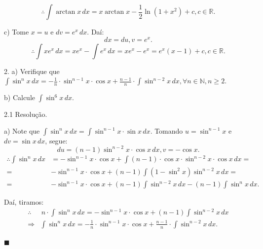 \documentclass{article}
\begin{document}
{\begin{newpage}
$$\therefore \displaystyle{\int \arctan{x}\, dx = x\arctan{x} - \frac{1}{2}\ln{(1 + x^{2})} + c,c\in\mathbb{R}}.$$
\par
\vspace{0.3cm}
c) Tome $x=u$ e $dv = e^{x}\, dx$. Daí:
\begin{equation*} \displaystyle{dx = du, v = e^{x} }.\end{equation*}
$$\therefore \displaystyle{\int xe^{x}\, dx = xe^{x} - \int e^{x}\, dx = xe^{x} - e^{x} = e^{x}(x-1) + c, c\in\mathbb{R}}.$$
\par
\vspace{0.3cm}
\begin{flushleft}
2. a) Verifique que $\displaystyle{\int \sin^{n}{x}\, dx = -\frac{1}{n}\cdot\sin^{n-1}{x}\cdot\cos{x} + \frac{n-1}{n}\cdot\int \sin^{n-2}{x}\, dx, \forall n\in\mathbb{N}, n\geq 2}.$
\par\hspace{12pt}b) Calcule $\displaystyle{\int \sin^{6}{x}\, dx}$.
\end{flushleft}
\par
\vspace{0.3cm}
\begin{flushleft}
2.1 Resolução.
\end{flushleft}
\par a) Note que $\displaystyle{\int \sin^{n}{x}\, dx = \int \sin^{n-1}{x}\cdot\sin{x}\, dx}$. Tomando $u=\sin^{n-1}{x}$ e $dv = \sin{x}\, dx$, segue:
\begin{equation*}\displaystyle{du = (n-1)\sin^{n-2}{x}\cdot\cos{x}\, dx , v = -\cos{x}}. \end{equation*}
$$\displaystyle{\begin{split}\therefore \int \sin^{n}{x}\, dx &= -\sin^{n-1}{x}\cdot\cos{x} + \int (n-1)\cdot\cos{x}\cdot\sin^{n-2}{x}\cdot\cos{x}\, dx               
= \\ =& -\sin^{n-1}{x}\cdot\cos{x} + (n-1)\int (1 - \sin^{2}{x})\sin^{n-2}{x}\, dx = \\ = &-\sin^{n-1}{x}\cdot\cos{x} + (n-1)\int \sin^{n-2}{x}\, dx - (n-1)\int \sin^{n}{x}\, dx.\end{split}}$$
\par Daí, tiramos:
$$\displaystyle{\begin{split}\therefore &\, n\cdot\int \sin^{n}{x}\, dx = -\sin^{n-1}{x}\cdot\cos{x} + (n-1)\int \sin^{n-2}{x}\, dx \\ \Rightarrow &\int \sin^{n}{x}\, dx = -\frac{1}{n}\cdot\sin^{n-1}{x}\cdot\cos{x} + \frac{n-1}{n}\cdot\int \sin^{n-2}{x}\, dx.\end{split}}$$\begin{flushright}$\blacksquare$\end{flushright}

\end{newpage}}
\end{document}
